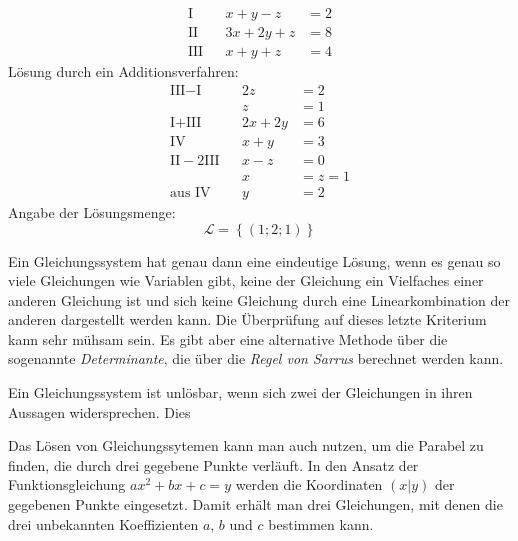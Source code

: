 \begin{bsp}[Additionsverfahren]
  \begin{align*}
  \text{I} && x+y-z &= 2\\
  \text{II} && 3x+2y+z &= 8\\
  \text{III} && x+y+z &= 4
 \end{align*}
 Lösung durch ein Additionsverfahren:
 \begin{align*}
  \text{III}-\text{I} && 2z &= 2\\
  && z&=1 \\
  \text{I}+\text{III} && 2x + 2y &= 6\\
  \text{IV}&& x+y &= 3 \\
  \text{II}-2\text{III}&& x -z &= 0\\
  && x&=z=1\\
  \text{aus IV}&& y&= 2
 \end{align*}
 Angabe der Lösungsmenge:
 \begin{equation*}
  \mathcal{L} = \left\lbrace (1;2;1) \right\rbrace
 \end{equation*}
 
\end{bsp}


\begin{regel}[Lösbarkeit]
 Ein Gleichungssystem hat genau dann eine eindeutige Lösung, wenn es genau so viele Gleichungen wie Variablen gibt, keine der Gleichung ein Vielfaches einer anderen Gleichung ist und sich keine Gleichung durch eine Linearkombination der anderen dargestellt werden kann. Die Überprüfung auf dieses letzte Kriterium kann sehr mühsam sein. Es gibt aber eine alternative Methode über die sogenannte \emph{Determinante}, die über die \emph{Regel von Sarrus} berechnet werden kann.

 Ein Gleichungssystem ist unlösbar, wenn sich zwei der Gleichungen in ihren Aussagen widersprechen.
 Dies 
 
\end{regel}

\begin{regel}[Determinante]
 
\end{regel}

\begin{beme}
 Das Lösen von Gleichungssytemen kann man auch nutzen, um die Parabel zu finden, die durch drei gegebene Punkte verläuft. In den Ansatz der Funktionsgleichung \(ax^2+bx+c=y\) werden die Koordinaten \((x|y)\) der gegebenen Punkte eingesetzt. Damit erhält man drei Gleichungen, mit denen die drei unbekannten Koeffizienten \(a\), \(b\) und \(c\) bestimmen kann.
\end{beme}

